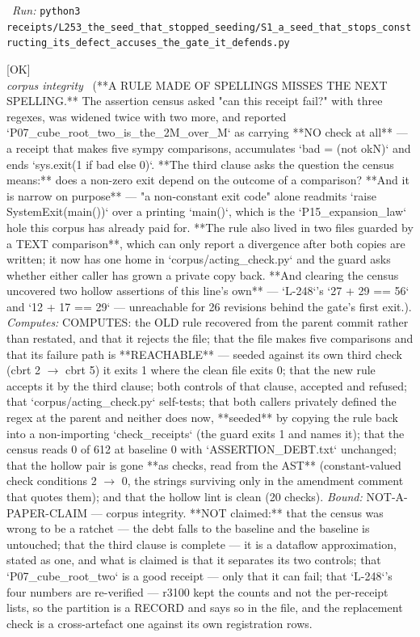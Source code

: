 \begin{description}
\ \emph{Run:} \texttt{python3 receipts/L253\_the\_seed\_that\_stopped\_seeding/S1\_a\_seed\_that\_stops\_constructing\_its\_defect\_accuses\_the\_gate\_it\_defends.py}
\item[\label{rcpt:A1_a_rule_made_of_spellings_misses_the_next_spelling}\texttt{A1\_a\_rule\_made\_of\_spellings\_misses\_the\_next\_spelling}]\hfill\textsf{[OK]}\\
\textit{corpus integrity} \ (**A RULE MADE OF SPELLINGS MISSES THE NEXT SPELLING.** The assertion census asked "can this receipt fail?" with three regexes, was widened twice with two more, and reported `P07\_cube\_root\_two\_is\_the\_2M\_over\_M` as carrying **NO check at all** --- a receipt that makes five sympy comparisons, accumulates `bad \textbar{}= (not okN)` and ends `sys.exit(1 if bad else 0)`. **The third clause asks the question the census means:** does a non-zero exit depend on the outcome of a comparison? **And it is narrow on purpose** --- "a non-constant exit code" alone readmits `raise SystemExit(main())` over a printing `main()`, which is the `P15\_expansion\_law` hole this corpus has already paid for. **The rule also lived in two files guarded by a TEXT comparison**, which can only report a divergence after both copies are written; it now has one home in `corpus/acting\_check.py` and the guard asks whether either caller has grown a private copy back. **And clearing the census uncovered two hollow assertions of this line's own** --- `L-248`'s `27 + 29 == 56` and `12 + 17 == 29` --- unreachable for 26 revisions behind the gate's first exit.). 
\emph{Computes:} COMPUTES: the OLD rule recovered from the parent commit rather than restated, and that it rejects the file; that the file makes five comparisons and that its failure path is **REACHABLE** --- seeded against its own third check (cbrt 2 \ensuremath{\to} cbrt 5) it exits 1 where the clean file exits 0; that the new rule accepts it by the third clause; both controls of that clause, accepted and refused; that `corpus/acting\_check.py` self-tests; that both callers privately defined the regex at the parent and neither does now, **seeded** by copying the rule back into a non-importing `check\_receipts` (the guard exits 1 and names it); that the census reads 0 of 612 at baseline 0 with `ASSERTION\_DEBT.txt` unchanged; that the hollow pair is gone **as checks, read from the AST** (constant-valued check conditions 2 \ensuremath{\to} 0, the strings surviving only in the amendment comment that quotes them); and that the hollow lint is clean (20 checks).
 \emph{Bound:} NOT-A-PAPER-CLAIM --- corpus integrity. **NOT claimed:** that the census was wrong to be a ratchet --- the debt falls to the baseline and the baseline is untouched; that the third clause is complete --- it is a dataflow approximation, stated as one, and what is claimed is that it separates its two controls; that `P07\_cube\_root\_two` is a good receipt --- only that it can fail; that `L-248`'s four numbers are re-verified --- r3100 kept the counts and not the per-receipt lists, so the partition is a RECORD and says so in the file, and the replacement check is a cross-artefact one against its own registration rows.

\end{description}
